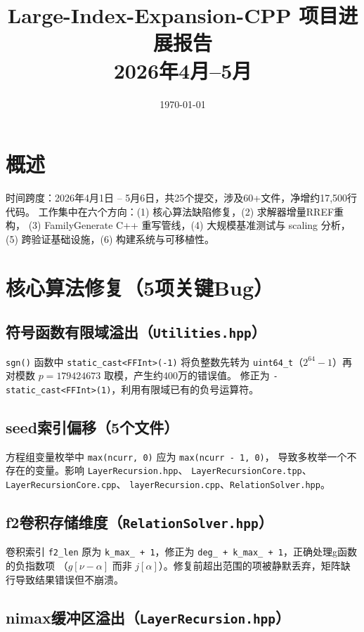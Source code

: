\documentclass[12pt,a4paper]{article}
\title{\textbf{Large-Index-Expansion-CPP 项目进展报告}\\2026年4月--5月}
\author{}
\date{\today}
\begin{document}
\maketitle

\section{概述}

时间跨度：2026年4月1日 -- 5月6日，共25个提交，涉及60+文件，净增约17,500行代码。
工作集中在六个方向：(1) 核心算法缺陷修复，(2) 求解器增量RREF重构，
(3) FamilyGenerate C++ 重写管线，(4) 大规模基准测试与 scaling 分析，
(5) 跨验证基础设施，(6) 构建系统与可移植性。

\section{核心算法修复（5项关键Bug）}

\subsection{符号函数有限域溢出（\texttt{Utilities.hpp}）}

\texttt{sgn()} 函数中 \texttt{static\_cast<FFInt>(-1)} 将负整数先转为
\texttt{uint64\_t}（$2^{64}-1$）再对模数 $p = 179424673$ 取模，产生约400万的错误值。
修正为 \texttt{-static\_cast<FFInt>(1)}，利用有限域已有的负号运算符。

\subsection{seed索引偏移（5个文件）}

方程组变量枚举中 \texttt{max(ncurr, 0)} 应为 \texttt{max(ncurr - 1, 0)}，
导致多枚举一个不存在的变量。影响 \texttt{LayerRecursion.hpp}、
\texttt{LayerRecursionCore.tpp}、\texttt{LayerRecursionCore.cpp}、
\texttt{layerRecursion.cpp}、\texttt{RelationSolver.hpp}。

\subsection{f2卷积存储维度（\texttt{RelationSolver.hpp}）}

卷积索引 \texttt{f2\_len} 原为 \texttt{k\_max\_ + 1}，修正为
\texttt{deg\_ + k\_max\_ + 1}，正确处理g函数的负指数项
（$g[\nu-\alpha]$ 而非 $j[\alpha]$）。修复前超出范围的项被静默丢弃，矩阵缺行导致结果错误但不崩溃。

\subsection{nimax缓冲区溢出（\texttt{LayerRecursion.hpp}）}
\end{document}
